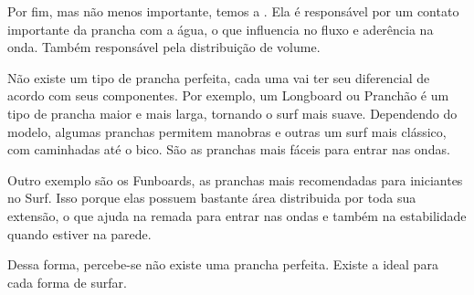 \documentclass[book, 12pt, twoside, a5paper, english, brazil, sumario=tradicional, openany]{abntex2}
\begin{document}
Por fim, mas não menos importante, temos a {\color{celestialblue}{borda}}. Ela é responsável por um contato importante da prancha com a água, o que influencia no fluxo e aderência na onda. Também responsável pela distribuição de volume.

\vspace{-0.5cm}

{}

\vspace{-0.3cm}

Não existe um tipo de prancha perfeita, cada uma vai ter seu diferencial de acordo com seus componentes. Por exemplo, um Longboard ou Pranchão é um tipo de prancha maior e mais larga, tornando o surf mais suave. Dependendo do modelo, algumas pranchas permitem manobras e outras um surf mais clássico, com caminhadas até o bico. São as pranchas mais fáceis para entrar nas ondas.

Outro exemplo são os Funboards, as pranchas mais recomendadas para iniciantes no Surf. Isso porque elas possuem bastante área distribuida por toda sua extensão, o que ajuda na remada para entrar nas ondas e também na estabilidade quando estiver na parede.

Dessa forma, percebe-se não existe uma prancha perfeita. Existe a ideal para cada forma de surfar.

\newpage

\pagestyle{empty}

{\large{{\textbf{{\color{black}{}}}}}}
\end{document}
